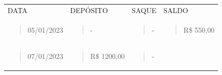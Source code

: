 \begin{longtable}[]{@{}llll@{}}
\toprule
\endhead
\begin{minipage}[t]{0.18\columnwidth}\raggedright
DATA\strut
\end{minipage} & \begin{minipage}[t]{0.20\columnwidth}\raggedright
DEPÓSITO\strut
\end{minipage} & \begin{minipage}[t]{0.20\columnwidth}\raggedright
SAQUE\strut
\end{minipage} & \begin{minipage}[t]{0.20\columnwidth}\raggedright
SALDO\strut
\end{minipage}\tabularnewline
\begin{minipage}[t]{0.18\columnwidth}\raggedright
\begin{quote}
05/01/2023
\end{quote}\strut
\end{minipage} & \begin{minipage}[t]{0.20\columnwidth}\raggedright
\begin{quote}
-
\end{quote}\strut
\end{minipage} & \begin{minipage}[t]{0.20\columnwidth}\raggedright
\begin{quote}
-
\end{quote}\strut
\end{minipage} & \begin{minipage}[t]{0.20\columnwidth}\raggedright
\begin{quote}
R\$ 550,00
\end{quote}\strut
\end{minipage}\tabularnewline
\begin{minipage}[t]{0.18\columnwidth}\raggedright
\begin{quote}
07/01/2023
\end{quote}\strut
\end{minipage} & \begin{minipage}[t]{0.20\columnwidth}\raggedright
\begin{quote}
R\$ 1200,00
\end{quote}\strut
\end{minipage} & \begin{minipage}[t]{0.20\columnwidth}\raggedright
\begin{quote}
-
\end{quote}\strut
\end{minipage} & \begin{minipage}[t]{0.20\columnwidth}\raggedright

\end{minipage}
\end{longtable}
